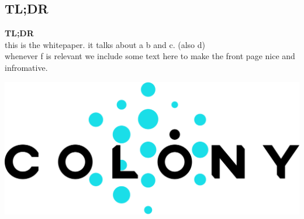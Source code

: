 
\subsection*{TL;DR}
\textbf{TL;DR}\\
this is the whitepaper. it talks about a b and c. (also d)\\
whenever f is relevant we include some text here to make the front page nice and infromative.\\[3cm] %

\begin{center}
\includegraphics[width=0.7\linewidth]{introduction/colonylogo.png} 
\end{center}

